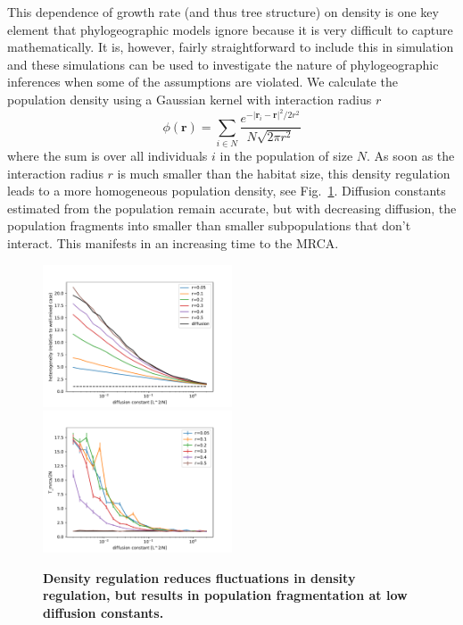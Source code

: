 \documentclass[aps,rmp, onecolumn]{revtex4}
\newcommand{\rvec}{\mathbf{r}}
\begin{document}
This dependence of growth rate (and thus tree structure) on density is one key element that phylogeographic models ignore because it is very difficult to capture mathematically.
It is, however, fairly straightforward to include this in simulation and these simulations can be used to investigate the nature of phylogeographic inferences when some of the assumptions are violated.
We calculate the population density using a Gaussian kernel with interaction radius $r$
\begin{equation}
    \phi(\rvec) = \sum_{i\in N} \frac{e^{-|\rvec_i - \rvec|^2/2r^2}}{N\sqrt{2\pi r^2}}
\end{equation}
where the sum is over all individuals $i$ in the population of size $N$.
As soon as the interaction radius $r$ is much smaller than the habitat size, this density regulation leads to a more homogeneous population density, see Fig.~\ref{fig:density_reg}.
Diffusion constants estimated from the population remain accurate, but with decreasing diffusion, the population fragments into smaller than smaller subpopulations that don't interact.
This manifests in an increasing time to the MRCA.

\begin{figure}
    \includegraphics[width=0.5\textwidth]{figures/density_reg_heterogeneity.pdf}
    \includegraphics[width=0.5\textwidth]{figures/density_reg_tmrca.pdf}
    \caption{\label{fig:density_reg} {\bf Density regulation reduces fluctuations in density regulation, but results in population fragmentation at low diffusion constants.}}
\end{figure}
\end{document}

